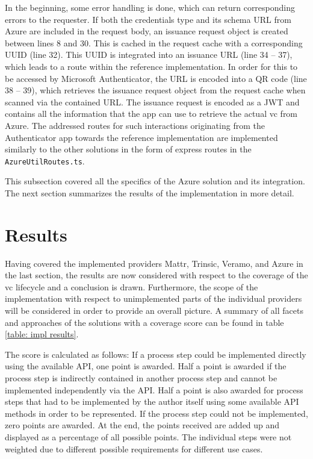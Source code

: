         In the beginning, some error handling is done, which can return corresponding errors to the requester. If both the credentials type and its schema URL from Azure are included in the request body, an issuance request object is created between lines 8 and 30. This is cached in the request cache with a corresponding UUID (line 32). This UUID is integrated into an issuance URL (line 34 – 37), which leads to a route within the reference implementation. In order for this to be accessed by Microsoft Authenticator, the URL is encoded into a QR code (line 38 – 39), which retrieves the issuance request object from the request cache when scanned via the contained URL. The issuance request is encoded as a JWT and contains all the information that the app can use to retrieve the actual \ac{vc} from Azure. The addressed routes for such interactions originating from the Authenticator app towards the reference implementation are implemented similarly to the other solutions in the form of express routes in the \texttt{AzureUtilRoutes.ts}.
        
        This subsection covered all the specifics of the Azure solution and its integration. The next section summarizes the results of the implementation in more detail.

    \section{Results} %
    
    Having covered the implemented providers Mattr, Trinsic, Veramo, and Azure in the last section, the results are now considered with respect to the coverage of the \ac{vc} lifecycle and a conclusion is drawn. Furthermore, the scope of the implementation with respect to unimplemented parts of the individual providers will be considered in order to provide an overall picture. A summary of all facets and approaches of the solutions with a coverage score can be found in table \ref{table: impl results}.
     
    The score is calculated as follows: If a process step could be implemented directly using the available API, one point is awarded. Half a point is awarded if the process step is indirectly contained in another process step and cannot be implemented independently via the API. Half a point is also awarded for process steps that had to be implemented by the author itself using some available API methods in order to be represented. If the process step could not be implemented, zero points are awarded. At the end, the points received are added up and displayed as a percentage of all possible points. The individual steps were not weighted due to different possible requirements for different use cases.
    
